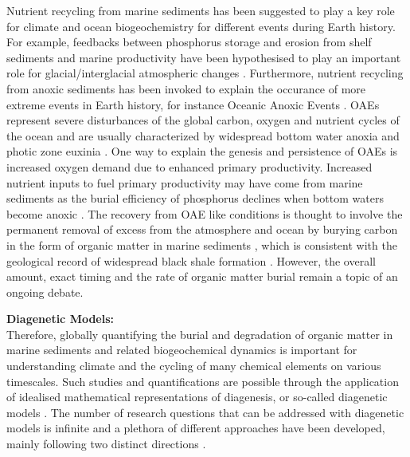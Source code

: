 \documentclass[gmd, manuscript]{copernicus}
\begin{document}
Nutrient recycling from marine sediments has been suggested to play a key role for climate and ocean biogeochemistry for different events during Earth history. 
For example, feedbacks between phosphorus storage and erosion from shelf sediments and marine productivity have been hypothesised to play an important role for glacial/interglacial atmospheric  changes \citep{broecker_ocean_1982, ruttenberg_reassessment_1993}. 
Furthermore, nutrient recycling from anoxic sediments has been invoked to explain the occurance of more extreme events in Earth history, for instance Oceanic Anoxic Events %
\citep[OAEs, e.g.][]{mort_phosphorus_2007, tsandev_modeling_2009}. OAEs represent severe disturbances of the global carbon, oxygen and nutrient cycles of the ocean and are usually characterized 
by widespread bottom water anoxia and photic zone euxinia \citep{jenkyns_geochemistry_2010}. 
One way to explain the genesis and persistence of OAEs is increased oxygen demand due to enhanced primary productivity. Increased nutrient inputs to fuel primary productivity may have come from marine sediments as the 
burial efficiency of phosphorus declines when bottom waters become anoxic \citep{ingall_evidence_1994, van_cappellen_benthic_1994}. 
The recovery from OAE like conditions is thought to involve the permanent removal of excess  from the atmosphere and ocean by burying carbon in the form of organic matter in marine sediments 
\citep[e.g.][]{arthur_geochemical_1988, jarvis_black_2011}, which is consistent with the geological record of widespread black shale formation \citep{stein_accumulation_1986}. 
However, the overall amount, exact timing and the rate of organic matter burial remain a topic of an ongoing debate. 


\textbf{Diagenetic Models:}\\
Therefore, globally quantifying the burial and degradation of organic matter in marine sediments and related biogeochemical dynamics is important for understanding 
climate and the cycling of many chemical elements on various timescales. Such studies and quantifications are possible through the application of idealised 
mathematical representations of diagenesis, or so-called diagenetic models \citep[see e.g.][]{berner_early_1980, boudreau1997diagenetic}.
The number of research questions that can be addressed with diagenetic models is infinite and a plethora of different approaches have been developed, mainly 
following two distinct directions \citep{arndt_quantifying_2013}. 
\end{document}
